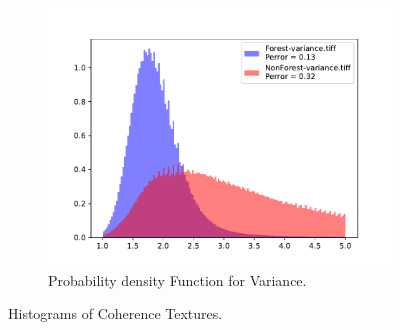 \begin{figure}[H]
  \centering
  \begin{subfigure}[b]{0.4\linewidth}
    \includegraphics[width=\linewidth]{Chapter5/SENTINEL1/Coherence/variance_histogram.pdf}
     \caption{Probability density Function for Variance.}
  \end{subfigure}
  \caption{Histograms of Coherence Textures.}
  \label{fig: sentinel_coherence_hist}
\end{figure}
\newpage


